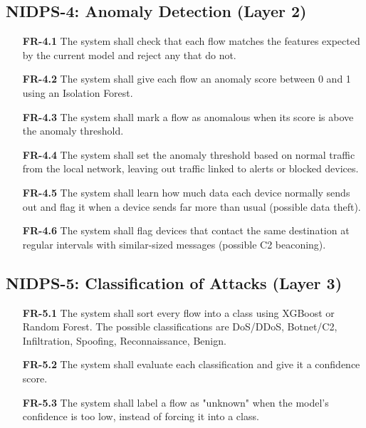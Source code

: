 \subsection{NIDPS-4: Anomaly Detection (Layer 2)}\label{sec:4.2.4}

\begin{itemize}[leftmargin=4.4em,labelwidth=3.9em,labelsep=0.5em,align=left]
\item[\hypertarget{req:FR-4.1}{\textbf{FR-4.1}}] The system shall check that each flow matches the features expected by the current model and reject any that do not.
\item[\hypertarget{req:FR-4.2}{\textbf{FR-4.2}}] The system shall give each flow an anomaly score between 0 and 1 using an Isolation Forest.
\item[\hypertarget{req:FR-4.3}{\textbf{FR-4.3}}] The system shall mark a flow as anomalous when its score is above the anomaly threshold.
\item[\hypertarget{req:FR-4.4}{\textbf{FR-4.4}}] The system shall set the anomaly threshold based on normal traffic from the local network, leaving out traffic linked to alerts or blocked devices.
\item[\hypertarget{req:FR-4.5}{\textbf{FR-4.5}}] The system shall learn how much data each device normally sends out and flag it when a device sends far more than usual (possible data theft).
\item[\hypertarget{req:FR-4.6}{\textbf{FR-4.6}}] The system shall flag devices that contact the same destination at regular intervals with similar-sized messages (possible C2 beaconing).
\end{itemize}

\subsection{NIDPS-5: Classification of Attacks (Layer 3)}\label{sec:4.2.5}

\begin{itemize}[leftmargin=4.4em,labelwidth=3.9em,labelsep=0.5em,align=left]
\item[\hypertarget{req:FR-5.1}{\textbf{FR-5.1}}] The system shall sort every flow into a class using XGBoost or Random Forest. The possible classifications are DoS/DDoS, Botnet/C2, Infiltration, Spoofing, Reconnaissance, Benign.
\item[\hypertarget{req:FR-5.2}{\textbf{FR-5.2}}] The system shall evaluate each classification and give it a confidence score.
\item[\hypertarget{req:FR-5.3}{\textbf{FR-5.3}}] The system shall label a flow as "unknown" when the model's confidence is too low, instead of forcing it into a class.
\end{itemize}

